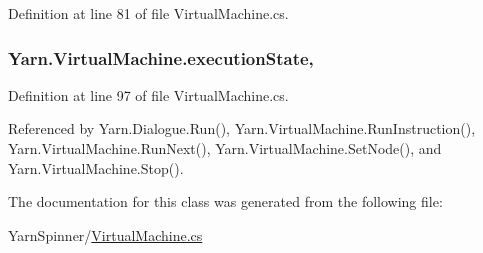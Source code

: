 Definition at line 81 of file Virtual\-Machine.\-cs.

\hypertarget{a00152_a66491da06023dabfb63d09e6ccbba74f}{
\subsubsection[{execution\-State}]{ Yarn.\-Virtual\-Machine.\-execution\-State\hspace{0.3cm}{\ttfamily [get]}, {\ttfamily [set]}}}\label{a00152_a66491da06023dabfb63d09e6ccbba74f}


Definition at line 97 of file Virtual\-Machine.\-cs.



Referenced by Yarn.\-Dialogue.\-Run(), Yarn.\-Virtual\-Machine.\-Run\-Instruction(), Yarn.\-Virtual\-Machine.\-Run\-Next(), Yarn.\-Virtual\-Machine.\-Set\-Node(), and Yarn.\-Virtual\-Machine.\-Stop().



The documentation for this class was generated from the following file\-:\begin{DoxyCompactItemize}
\item 
Yarn\-Spinner/\hyperlink{a00298}{Virtual\-Machine.\-cs}\end{DoxyCompactItemize}
